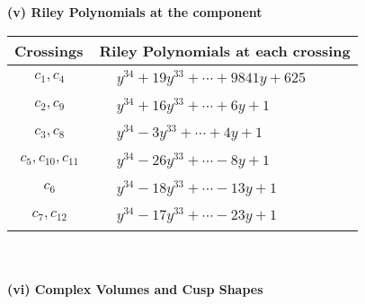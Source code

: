 \documentclass[1p]{elsarticle_modified}
\theoremstyle{definition}
\begin{document}
\newpage\renewcommand{\arraystretch}{1}
\flushleft \textbf{(v) Riley Polynomials at the component}\newline \\
\begin{tabular}{m{50pt}|m{274pt}}
Crossings & \hspace{64pt}Riley Polynomials at each crossing \\
\hline $$\begin{aligned}c_{1},c_{4}\end{aligned}$$&$\begin{aligned}
&y^{34}+19 y^{33}+\cdots+9841 y+625
\end{aligned}$\\
\hline $$\begin{aligned}c_{2},c_{9}\end{aligned}$$&$\begin{aligned}
&y^{34}+16 y^{33}+\cdots+6 y+1
\end{aligned}$\\
\hline $$\begin{aligned}c_{3},c_{8}\end{aligned}$$&$\begin{aligned}
&y^{34}-3 y^{33}+\cdots+4 y+1
\end{aligned}$\\
\hline $$\begin{aligned}c_{5},c_{10},c_{11}\end{aligned}$$&$\begin{aligned}
&y^{34}-26 y^{33}+\cdots-8 y+1
\end{aligned}$\\
\hline $$\begin{aligned}c_{6}\end{aligned}$$&$\begin{aligned}
&y^{34}-18 y^{33}+\cdots-13 y+1
\end{aligned}$\\
\hline $$\begin{aligned}c_{7},c_{12}\end{aligned}$$&$\begin{aligned}
&y^{34}-17 y^{33}+\cdots-23 y+1
\end{aligned}$\\
\hline
\end{tabular}\\~\\
\newpage\flushleft \textbf{(vi) Complex Volumes and Cusp Shapes}
\end{document}
